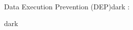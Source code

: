 \label{Data Execution Prevention (DEP)}
\begin{baseBoxThree}{Data Execution Prevention (DEP)}{dark}
    \bigskip
    :
    \bigskip
    \begin{baseBoxThree}{}{dark}

    \end{baseBoxThree}
    \smallskip
\end{baseBoxThree}
